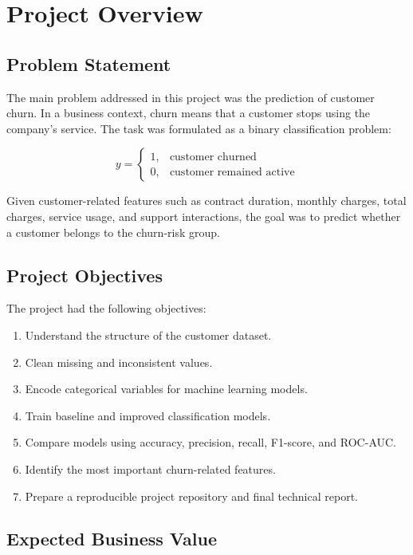 \documentclass[12pt,a4paper]{article}
\begin{document}
\section{Project Overview}

\subsection{Problem Statement}

The main problem addressed in this project was the prediction of customer churn. In a business context, churn means that a customer stops using the company's service. The task was formulated as a binary classification problem:

\[
    y =
    \begin{cases}
    1, & \text{customer churned} \\
    0, & \text{customer remained active}
    \end{cases}
\]

Given customer-related features such as contract duration, monthly charges, total charges, service usage, and support interactions, the goal was to predict whether a customer belongs to the churn-risk group.

\subsection{Project Objectives}

The project had the following objectives:

\begin{enumerate}
    \item Understand the structure of the customer dataset.
    \item Clean missing and inconsistent values.
    \item Encode categorical variables for machine learning models.
    \item Train baseline and improved classification models.
    \item Compare models using accuracy, precision, recall, F1-score, and ROC-AUC.
    \item Identify the most important churn-related features.
    \item Prepare a reproducible project repository and final technical report.
\end{enumerate}

\subsection{Expected Business Value}
\end{document}
